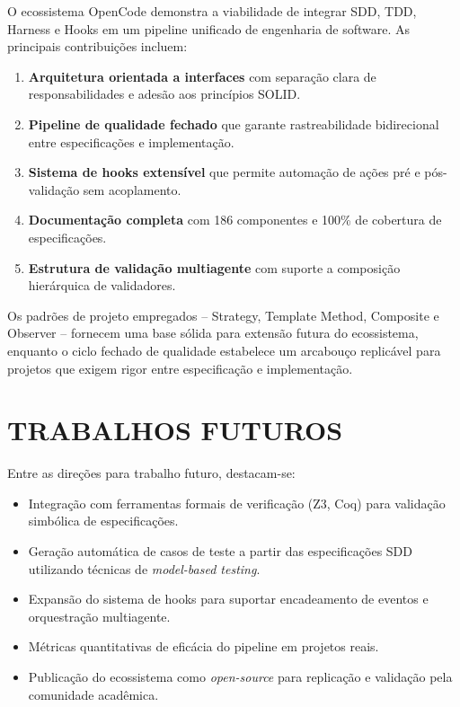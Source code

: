 \documentclass[
  brazil,
  sumario=tradicional,
  10pt
]{abntex2}
\begin{document}
O ecossistema OpenCode demonstra a viabilidade de integrar SDD, TDD,
Harness e Hooks em um pipeline unificado de engenharia de software. As
principais contribuições incluem:

\begin{enumerate}
  \item \textbf{Arquitetura orientada a interfaces} com separação clara
    de responsabilidades e adesão aos princípios SOLID.
  \item \textbf{Pipeline de qualidade fechado} que garante rastreabilidade
    bidirecional entre especificações e implementação.
  \item \textbf{Sistema de hooks extensível} que permite automação de
    ações pré e pós-validação sem acoplamento.
  \item \textbf{Documentação completa} com 186 componentes e 100\% de
    cobertura de especificações.
  \item \textbf{Estrutura de validação multiagente} com suporte a
    composição hierárquica de validadores.
\end{enumerate}

Os padrões de projeto empregados -- Strategy, Template Method, Composite
e Observer -- fornecem uma base sólida para extensão futura do
ecossistema, enquanto o ciclo fechado de qualidade estabelece um
arcabouço replicável para projetos que exigem rigor entre especificação
e implementação.

\section{TRABALHOS FUTUROS}

Entre as direções para trabalho futuro, destacam-se:

\begin{itemize}
  \item Integração com ferramentas formais de verificação (Z3, Coq) para
    validação simbólica de especificações.
  \item Geração automática de casos de teste a partir das especificações
    SDD utilizando técnicas de \textit{model-based testing}.
  \item Expansão do sistema de hooks para suportar encadeamento de
    eventos e orquestração multiagente.
  \item Métricas quantitativas de eficácia do pipeline em projetos reais.
  \item Publicação do ecossistema como \textit{open-source} para
    replicação e validação pela comunidade acadêmica.
\end{itemize}


\end{document}
